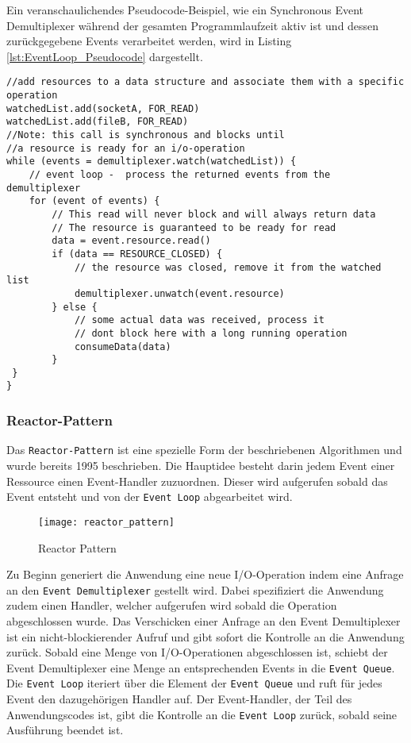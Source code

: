 Ein veranschaulichendes Pseudocode-Beispiel, wie ein Synchronous Event Demultiplexer während der
gesamten Programmlaufzeit aktiv ist und dessen zurückgegebene Events verarbeitet werden,
wird in Listing \ref{lst:EventLoop_Pseudocode} dargestellt.
\begin{lstlisting}[caption=Einfaches Pseudocode-Beispiel für Synchronous Event Demultiplexing mit Event Loop),
captionpos=b, label=lst:EventLoop_Pseudocode]
//add resources to a data structure and associate them with a specific operation
watchedList.add(socketA, FOR_READ)                            
watchedList.add(fileB, FOR_READ)
//Note: this call is synchronous and blocks until
//a resource is ready for an i/o-operation
while (events = demultiplexer.watch(watchedList)) {
	// event loop -  process the returned events from the demultiplexer
	for (event of events) {
		// This read will never block and will always return data
		// The resource is guaranteed to be ready for read
		data = event.resource.read()
		if (data == RESOURCE_CLOSED) {
			// the resource was closed, remove it from the watched list
			demultiplexer.unwatch(event.resource)
		} else {
			// some actual data was received, process it 
			// dont block here with a long running operation
			consumeData(data)
		}
 }
}
\end{lstlisting}\parencite[Event Demultiplexing]{NodeJSDesignPatterns}
\newpage
\subsubsection{Reactor-Pattern}
\label{subsubsec:reactor_pattern}
Das \verb|Reactor-Pattern| ist eine spezielle Form der beschriebenen Algorithmen und wurde bereits 1995 beschrieben.\parencite{SchmidtReactorPattern}
Die Hauptidee besteht darin jedem Event einer Ressource einen Event-Handler zuzuordnen.
Dieser wird aufgerufen sobald das Event entsteht und von der \verb|Event Loop| abgearbeitet wird.

\begin{figure}[H]
	\centering
	\texttt{[image: reactor\_pattern]}
	\caption{Reactor Pattern \parencite[Abbildung 1.3]{NodeJSDesignPatterns}}
	\label{fig:reactor_pattern}
\end{figure}

Zu Beginn generiert die Anwendung eine neue I/O-Operation indem eine Anfrage an den \verb|Event Demultiplexer| gestellt wird.
Dabei spezifiziert die Anwendung zudem einen Handler, welcher aufgerufen wird sobald die Operation abgeschlossen wurde.
Das Verschicken einer Anfrage an den Event Demultiplexer ist ein nicht-blockierender Aufruf und gibt sofort die Kontrolle
an die Anwendung zurück.
Sobald eine Menge von I/O-Operationen abgeschlossen ist, schiebt der Event Demultiplexer eine Menge an entsprechenden Events
in die \verb|Event Queue|.
Die \verb|Event Loop| iteriert über die Element der \verb|Event Queue| und ruft für jedes Event den dazugehörigen Handler auf.
Der Event-Handler, der Teil des Anwendungscodes ist, gibt die Kontrolle an die \verb|Event Loop| zurück, sobald seine Ausführung
beendet ist.


